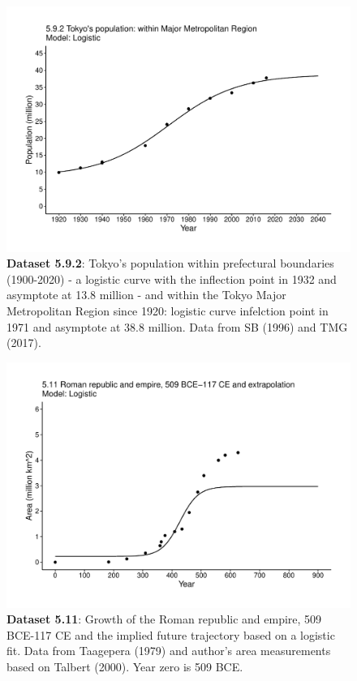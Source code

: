\documentclass[aps,rmp,preprint,superscriptaddress,10pt,onecolumn]{article}
\begin{document}
\clearpage
\begin{figure}[h]
\includegraphics[width=\textwidth]{output/figs-ggplot/5.9.2.pdf}
\caption{\textbf{Dataset 5.9.2}: Tokyo's population within prefectural boundaries (1900-2020) - a logistic curve with the inflection point in 1932 and asymptote at 13.8 million - and within the Tokyo Major Metropolitan Region since 1920: logistic curve infelction point in 1971 and asymptote at 38.8 million. Data from SB (1996) and TMG (2017). }
\end{figure}
	
\clearpage
\begin{figure}[h]
\includegraphics[width=\textwidth]{output/figs-ggplot/5.11.pdf}
\caption{\textbf{Dataset 5.11}: Growth of the Roman republic and empire, 509 BCE-117 CE and the implied future trajectory based on a logistic fit. Data from Taagepera (1979) and author's area measurements based on Talbert (2000). Year zero is 509 BCE. }
\end{figure}
	
\end{document}
